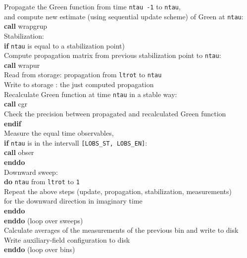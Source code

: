 \begin{mdframed}[frametitle={Implementation of the auxiliary-field QMC method:}]
{         Propagate the Green function from time \texttt{ntau -1} to \texttt{ntau},  \\
         and compute new estimate (using sequential update scheme) of Green at \texttt{ntau}: \\
         \textbf{call} wrapgrup\\
         
         Stabilization: \\     
         \textbf{if} \texttt{ntau} is equal to a stabilization point)\\
            Compute propagation matrix from previous stabilization point to \texttt{ntau}: \\
            \textbf{call} wrapur\\
            Read from storage: propagation from \texttt{ltrot} to \texttt{ntau}\\
            Write to storage : the just computed propagation \\
                        
            Recalculate Green function at time \texttt{ntau} in a stable way:\\
            \textbf{call} cgr\\
            
            Check the precision between propagated and recalculated Green function\\
         \textbf{endif}\\
        
         Measure the equal time observables, \\
         \textbf{if} \texttt{ntau} is in the intervall \texttt{[LOBS\_ST, LOBS\_EN]}:\\
         \textbf{call} obser\\
      \textbf{enddo}\\
      
      Downward sweep:\\
      \textbf{do} \texttt{ntau} from \texttt{ltrot} to \texttt{1}\\
         Repeat the above steps (update, propagation, stabilization, measurements) \\
         for the downward direction in imaginary time\\
      \textbf{enddo}\\
      
   \textbf{enddo} (loop over sweeps)\\
    
   Calculate averages of the measurements of the previous bin and write to disk\\
   Write auxiliary-field configuration to disk\\
   
\textbf{enddo} (loop over bins)     
   

}
\end{mdframed}
